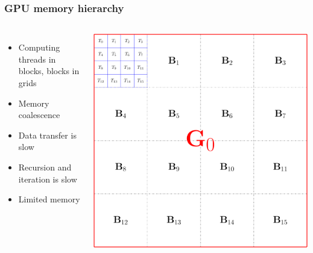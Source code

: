 \documentclass{beamer}
\begin{document}
\begin{frame}
\frametitle{GPU memory hierarchy}

\begin{columns}
\begin{itemize}
\item Computing threads in blocks, blocks in grids
\item Memory coalescence
\item Data transfer is slow
\item Recursion and iteration is slow
\item Limited memory
\end{itemize}


\includegraphics[width=\textwidth]{../data/gpu/gputhreads.pdf}
\end{columns}
\end{frame}
\end{document}
